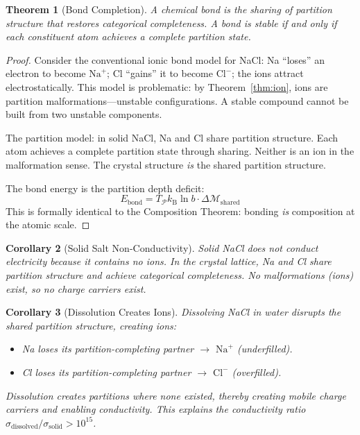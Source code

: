 \documentclass[twocolumn,10pt,a4paper]{article}
\theoremstyle{plain}
\newtheorem{theorem}{Theorem}[section]
\newtheorem{corollary}[theorem]{Corollary}
\theoremstyle{definition}
\theoremstyle{remark}
\newcommand{\kB}{k_{\mathrm{B}}}
\newcommand{\Depth}{\mathcal{M}}
\newcommand{\Partition}{\mathcal{P}}
\begin{document}
\begin{theorem}[Bond Completion]
\label{thm:bond}
A chemical bond is the sharing of partition structure that restores categorical completeness. A bond is stable if and only if each constituent atom achieves a complete partition state.
\end{theorem}

\begin{proof}
Consider the conventional ionic bond model for NaCl: Na ``loses'' an electron to become $\mathrm{Na}^+$; Cl ``gains'' it to become $\mathrm{Cl}^-$; the ions attract electrostatically. This model is problematic: by Theorem~\ref{thm:ion}, ions are partition malformations---unstable configurations. A stable compound cannot be built from two unstable components.

The partition model: in solid NaCl, Na and Cl share partition structure. Each atom achieves a complete partition state through sharing. Neither is an ion in the malformation sense. The crystal structure \emph{is} the shared partition structure.

The bond energy is the partition depth deficit:
\begin{equation}
    E_{\mathrm{bond}} = T_\Partition \kB \ln b \cdot \Delta\Depth_{\mathrm{shared}}
\end{equation}
This is formally identical to the Composition Theorem: bonding \emph{is} composition at the atomic scale.
\end{proof}

\begin{corollary}[Solid Salt Non-Conductivity]
\label{cor:solid_salt}
Solid NaCl does not conduct electricity because it contains no ions. In the crystal lattice, Na and Cl share partition structure and achieve categorical completeness. No malformations (ions) exist, so no charge carriers exist.
\end{corollary}

\begin{corollary}[Dissolution Creates Ions]
\label{cor:dissolution}
Dissolving NaCl in water disrupts the shared partition structure, creating ions:
\begin{itemize}
    \item Na loses its partition-completing partner $\rightarrow$ $\mathrm{Na}^+$ (underfilled).
    \item Cl loses its partition-completing partner $\rightarrow$ $\mathrm{Cl}^-$ (overfilled).
\end{itemize}
Dissolution \emph{creates} partitions where none existed, thereby creating mobile charge carriers and enabling conductivity. This explains the conductivity ratio $\sigma_{\mathrm{dissolved}}/\sigma_{\mathrm{solid}} > 10^{15}$.
\end{corollary}
\end{document}
